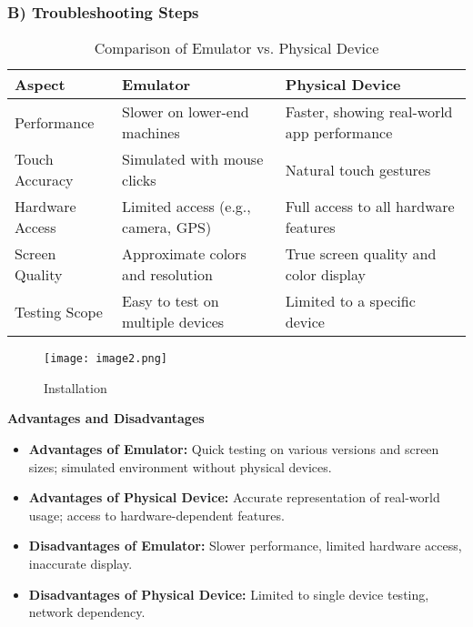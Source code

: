 \documentclass{article}
\begin{document}
\subsubsection*{B) Troubleshooting Steps}
\begin{table}
    \centering
    \begin{tabular}{|p{}|p{}|p{}|}
        \hline
        \textbf{Aspect} & \textbf{Emulator} & \textbf{Physical Device} \\
        \hline
        Performance & Slower on lower-end machines & Faster, showing real-world app performance \\
        \hline
        Touch Accuracy & Simulated with mouse clicks & Natural touch gestures \\
        \hline
        Hardware Access & Limited access (e.g., camera, GPS) & Full access to all hardware features \\
        \hline
        Screen Quality & Approximate colors and resolution & True screen quality and color display \\
        \hline
        Testing Scope & Easy to test on multiple devices & Limited to a specific device \\
        \hline
    \end{tabular}
    \caption{Comparison of Emulator vs. Physical Device}
    \label{tab:emulator-vs-physical}
\end{table}


\begin{figure}
    \centering
    \texttt{[image: image2.png]} %
    \caption{Installation}
    \label{fig:enter-label}
\end{figure}


\textbf{Advantages and Disadvantages}
\begin{itemize}
    \item \textbf{Advantages of Emulator:} Quick testing on various versions and screen sizes; simulated environment without physical devices.
    \item \textbf{Advantages of Physical Device:} Accurate representation of real-world usage; access to hardware-dependent features.
    \item \textbf{Disadvantages of Emulator:} Slower performance, limited hardware access, inaccurate display.
    \item \textbf{Disadvantages of Physical Device:} Limited to single device testing, network dependency.
\end{itemize}
\end{document}
